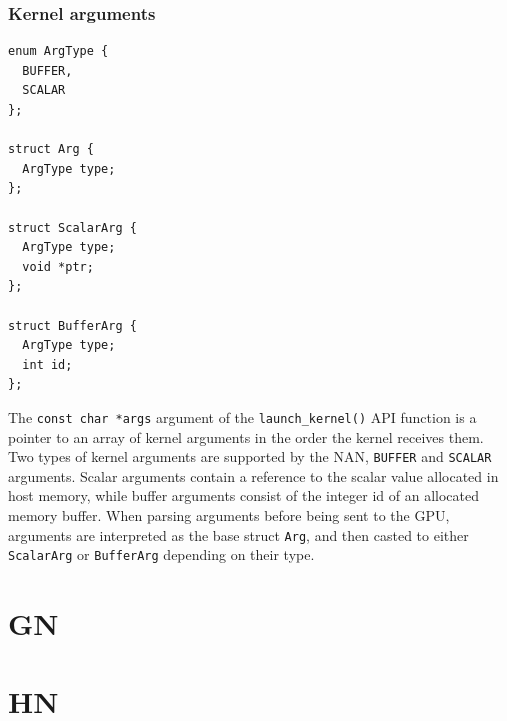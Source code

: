 \subsubsection{Kernel arguments}

\begin{lstlisting}[style=CStyle, label=NAN:ResourceArguments, caption=Nvidia Architecture Manager - Kernel arguments]
enum ArgType {
  BUFFER,
  SCALAR
};

struct Arg {
  ArgType type;
};

struct ScalarArg {
  ArgType type;
  void *ptr;
};

struct BufferArg {
  ArgType type;
  int id;
};
\end{lstlisting}

The \texttt{const char *args} argument of the \texttt{launch\_kernel()} API function is a pointer to an array of kernel arguments in the order the kernel receives them. Two types of kernel arguments are supported by the NAN, \texttt{BUFFER} and \texttt{SCALAR} arguments. Scalar arguments contain a reference to the scalar value allocated in host memory, while buffer arguments consist of the integer id of an allocated memory buffer. When parsing arguments before being sent to the GPU, arguments are interpreted as the base struct \texttt{Arg}, and then casted to either \texttt{ScalarArg} or \texttt{BufferArg} depending on their type.


\section{GN}

\section{HN}